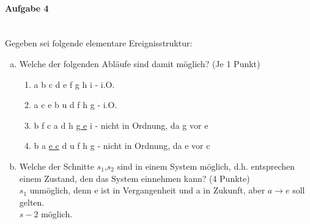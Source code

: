 \documentclass[a4paper,12pt]{scrartcl}
\begin{document}
\paragraph{Aufgabe 4}\quad\\
Gegeben sei folgende elementare Ereignisstruktur:
\begin{enumerate}[(a)]
 \item Welche der folgenden Abläufe sind damit möglich? (Je 1 Punkt)
 \begin{enumerate}
  \item a b c d e f g h i  - i.O.
  \item a c e b u d f h g  - i.O.
  \item b f c a d h \underline{g e} i  - nicht in Ordnung, da g vor e
  \item b a \underline{e c} d u f h g  - nicht in Ordnung, da e vor c
 \end{enumerate}
 \item Welche der Schnitte $s_1$,$s_2$ sind in einem System möglich, d.h. entsprechen einem Zustand, den das System einnehmen kann? (4 Punkte)\\
  $s_1$ unmöglich, denn e ist in Vergangenheit und a in Zukunft, aber $a\to e$ soll gelten.\\
 $s-2$ möglich.
 \end{enumerate}
\end{document}
